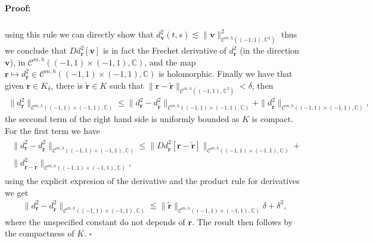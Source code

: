 \documentclass{article}
\newenvironment{proof}{\paragraph{Proof:}}{\hfill$\square$}
\newcommand{\IC}{{\mathbb C}}
\newcommand{\cmspaceh}[4]{\mathcal{C}^{#1,#2} \left( #3, #4 \right)}
\newcommand{\cgeoh}[1]{\mathcal{C}^{#1,h}\left( (-1,1), \IC^2 \right)}
\newcommand{\bv}{\bm{v}}
\newcommand{\br}{\bm{r}}
\newcommand{\iinterv}{(-1,1)\times(-1,1)}
\begin{document}
\begin{proof}
\begin{align*}
\end{align*} 
using this rule we can directly show that $d_{\bv}^2(t,s) \lesssim \|\bv\|^2_{\cgeoh{m}}$ thus we conclude that $D d_{\br}^2[\bv]$ is in fact the Frechet derivative of $d^2_{\br}$ (in the direction $\bv$), in $\cmspaceh{m}{h}{\iinterv}{\IC}$, and the map $\br  \mapsto d_{\br}^2 \in \cmspaceh{m}{h}{(-1,1)\times(-1,1)}{\IC}$ is holomorphic. Finally we have that given $\br \in K_\delta$, there is $\widetilde{\br} \in K$ such that $\| \br - \widetilde{\br}\|_{\cmspaceh{m}{h}{(-1,1)}{\IC^2}} < \delta$, then 
\begin{align*}
\| d^2_{\br} \|_{\cmspaceh{m}{h}{\iinterv}{\IC}} \leq \| d^2_{\br}  - d_{\widetilde{\br}}^2 \|_{\cmspaceh{m}{h}{\iinterv}{\IC}}  + \| d_{\widetilde{\br}}^2 \|_{\cmspaceh{m}{h}{\iinterv}{\IC}},
\end{align*}
the seccond term of the right hand side is uniformly bounded as $K$ is compact. For the first term we have
\begin{align*}
\begin{split}
\|d^2_{\br}  - d_{\widetilde{\br}}^2 \|_{\cmspaceh{m}{h}{\iinterv}{\IC}} \leq 
\|D d^2_{\widetilde{\br}}[\br - \widetilde{\br}]\|_{\cmspaceh{m}{h}{\iinterv}{\IC}} +\\ \| d^2_{\br -\widetilde{\br}}\|_{\cmspaceh{m}{h}{\iinterv}{\IC}},
\end{split}
\end{align*} 
 using the explicit expresion of the derivative and the product rule for derivatives we get
\begin{align*}
\|d^2_{\br}  - d_{\widetilde{\br}}^2 \|_{\cmspaceh{m}{h}{\iinterv}{\IC}} \lesssim 
\|\widetilde{\br}\|_{\cmspaceh{m}{h}{\iinterv}{\IC}} \delta  + \delta^2,
\end{align*}
where the unspecified constant do not depends of $\br$. The result then follows by the compactness of $K$.
\end{proof}
\end{document}
